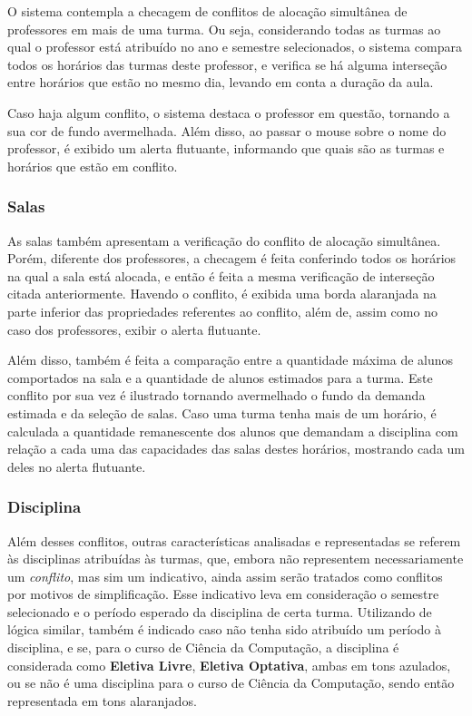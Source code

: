 O sistema contempla a checagem de conflitos de alocação simultânea de professores em mais de uma turma. Ou seja, considerando todas as turmas ao qual o professor está atribuído no ano e semestre selecionados, o sistema compara todos os horários das turmas deste professor, e verifica se há alguma interseção entre horários que estão no mesmo dia, levando em conta a duração da aula.

Caso haja algum conflito, o sistema destaca o professor em questão, tornando a sua cor de fundo avermelhada. Além disso, ao passar o mouse sobre o nome do professor, é exibido um alerta flutuante, informando que quais são as turmas e horários que estão em conflito.

\subsubsection{Salas}

As salas também apresentam a verificação do conflito de alocação simultânea. Porém, diferente dos professores, a checagem é feita conferindo todos os horários na qual a sala está alocada, e então é feita a mesma verificação de interseção citada anteriormente. Havendo o conflito, é exibida uma borda alaranjada na parte inferior das propriedades referentes ao conflito, além de, assim como no caso dos professores, exibir o alerta flutuante.

Além disso, também é feita a comparação entre a quantidade máxima de alunos comportados na sala e a quantidade de alunos estimados para a turma. Este conflito por sua vez é ilustrado tornando avermelhado o fundo da demanda estimada e da seleção de salas. Caso uma turma tenha mais de um horário, é calculada a quantidade remanescente dos alunos que demandam a disciplina com relação a cada uma das capacidades das salas destes horários, mostrando cada um deles no alerta flutuante.

\subsubsection{Disciplina}

Além desses conflitos, outras características analisadas e representadas se referem às disciplinas atribuídas às turmas, que, embora não representem necessariamente um \textit{conflito}, mas sim um indicativo, ainda assim serão tratados como conflitos por motivos de simplificação. Esse indicativo leva em consideração o semestre selecionado e o período esperado da disciplina de certa turma. Utilizando de lógica similar, também é indicado caso não tenha sido atribuído um período à disciplina, e se, para o curso de Ciência da Computação, a disciplina é considerada como \textbf{Eletiva Livre}, \textbf{Eletiva Optativa}, ambas em tons azulados, ou se não é uma disciplina para o curso de Ciência da Computação, sendo então representada em tons alaranjados.

